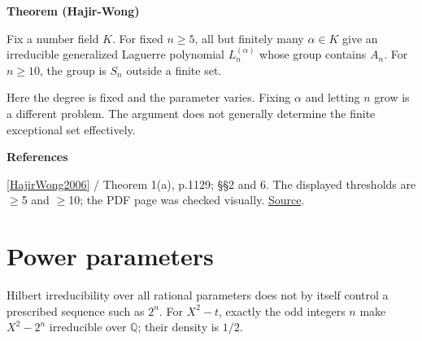 \documentclass[11pt,a4paper,oneside,openany]{book}
\newenvironment{sources}{\par\smallskip\begingroup\footnotesize\color{atlasgray}\leftskip=10pt\setlength{\parskip}{2pt}}{\par\endgroup\smallskip}
\begin{document}
\begin{atlasblock}[standard]
\textbf{\sffamily Theorem (Hajir-Wong)}\par\smallskip
\color{black} Fix a number field \(K\). For fixed \(n\ge5\), all but finitely many \(\alpha\in K\) give an irreducible generalized Laguerre polynomial \(L_n^{(\alpha)}\) whose group contains \(A_n\). For \(n\ge10\), the group is \(S_n\) outside a finite set.\par
\end{atlasblock}\color{black}
\color{black} Here the degree is fixed and the parameter varies. Fixing \(\alpha\) and letting \(n\) grow is a different problem. The argument does not generally determine the finite exceptional set effectively.\par
\begin{sources}
\textbf{References}\par\smallskip
\noindent\hyperlink{ref:HajirWong2006}{[HajirWong2006]} / Theorem 1(a), p.1129; §§2 and 6. The displayed thresholds are \ensuremath{\ge}5 and \ensuremath{\ge}10; the PDF page was checked visually. \href{https://www.numdam.org/item/AIF_2006__56_4_1127_0/}{Source}.\par
\end{sources}\color{black}
\section{Power parameters}
\color{black} Hilbert irreducibility over all rational parameters does not by itself control a prescribed sequence such as \(2^n\). For \(X^2-t\), exactly the odd integers \(n\) make \(X^2-2^n\) irreducible over \(\mathbb Q\); their density is \(1/2\).\par
\end{document}
